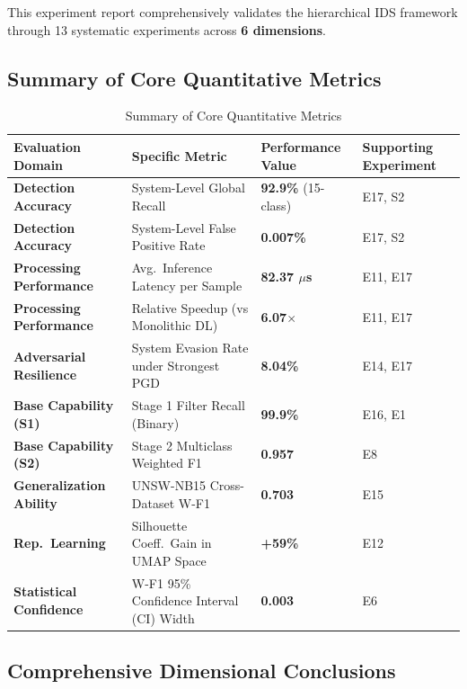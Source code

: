 \documentclass[sigconf]{acmart}
\begin{document}
This experiment report comprehensively validates the hierarchical IDS framework through 13 systematic experiments across \textbf{6 dimensions}.

\subsection{Summary of Core Quantitative Metrics}

\begin{table}[H]
\caption{Summary of Core Quantitative Metrics}
\label{tab:core_metrics}
\begin{tabular}{p{3.5cm}p{4.5cm}p{3cm}p{3cm}}
\toprule
\textbf{Evaluation Domain} & \textbf{Specific Metric} & \textbf{Performance Value} & \textbf{Supporting Experiment} \\
\midrule
\textbf{Detection Accuracy} & System-Level Global Recall & \textbf{92.9\%} (15-class) & E17, S2 \\
\textbf{Detection Accuracy} & System-Level False Positive Rate & \textbf{0.007\%} & E17, S2 \\
\textbf{Processing Performance} & Avg.\ Inference Latency per Sample & \textbf{82.37 $\mu$s} & E11, E17 \\
\textbf{Processing Performance} & Relative Speedup (vs Monolithic DL) & \textbf{6.07$\times$} & E11, E17 \\
\textbf{Adversarial Resilience} & System Evasion Rate under Strongest PGD & \textbf{8.04\%} & E14, E17 \\
\textbf{Base Capability (S1)} & Stage 1 Filter Recall (Binary) & \textbf{99.9\%} & E16, E1 \\
\textbf{Base Capability (S2)} & Stage 2 Multiclass Weighted F1 & \textbf{0.957} & E8 \\
\textbf{Generalization Ability} & UNSW-NB15 Cross-Dataset W-F1 & \textbf{0.703} & E15 \\
\textbf{Rep.\ Learning} & Silhouette Coeff.\ Gain in UMAP Space & \textbf{+59\%} & E12 \\
\textbf{Statistical Confidence} & W-F1 95\% Confidence Interval (CI) Width & \textbf{0.003} & E6 \\
\bottomrule
\end{tabular}
\end{table}

\subsection{Comprehensive Dimensional Conclusions}
\end{document}
